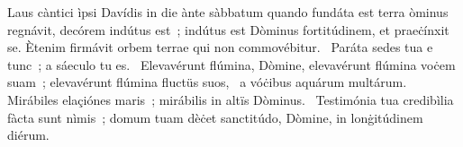 { Laus càntici ìpsi Davídis in die ànte sàbbatum quando fundáta est terra}
{%
òminus regnávit, decórem indútus est~; indútus est Dòminus fortitúdinem, et praeċínxit se. Ètenim firmávit orbem terrae qui non commovébitur. 
~Paráta sedes tua e tunc~; a sáeculo tu es. 
~Elevavérunt flúmina, Dòmine, elevavérunt flúmina voċem suam~; elevavérunt flúmina fluctüs suos, 
~a vóċibus aquárum multárum. Mirábiles elaçiónes maris~; mirábilis in altïs Dòminus. 
~Testimónia tua credibìlia fàcta sunt nìmis~; domum tuam dèċet sanctitúdo, Dòmine, in lonġitúdinem diérum. 
}
